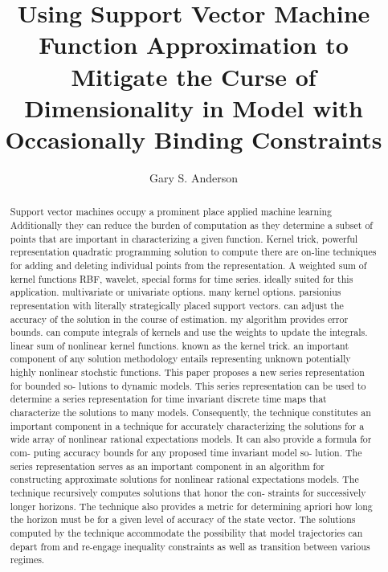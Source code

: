 \documentclass[12pt]{article}
\title{Using Support Vector Machine Function Approximation to
Mitigate the Curse of Dimensionality in Model with Occasionally Binding Constraints}
\author{Gary S. Anderson}
\begin{document}
\begin{abstract}
Support vector machines occupy a prominent place applied machine learning
Additionally they can reduce the burden of computation as they determine
a subset of points that are important in characterizing a given function.
Kernel trick,  powerful representation quadratic programming solution to compute there are on-line techniques for adding and deleting individual points from the representation.  A weighted sum of kernel functions RBF, wavelet, special forms for time series.    ideally suited for this application.  multivariate or univariate options.  many kernel options.  parsionius representation with literally strategically placed support vectors.  can adjust the accuracy of the solution in the course of estimation.  my algorithm provides error bounds.  can compute integrals of kernels and use the weights to update the integrals.  linear sum of nonlinear kernel functions. known as the kernel trick.  an important component of any solution methodology entails representing unknown potentially highly nonlinear stochstic functions.
  This paper proposes a new series representation for bounded so-
lutions to dynamic models. This series representation can be used
to determine a series representation for time invariant discrete time
maps that characterize the solutions to many models. Consequently,
the technique constitutes an important component in a technique for
accurately characterizing the solutions for a wide array of nonlinear
rational expectations models. It can also provide a formula for com-
puting accuracy bounds for any proposed time invariant model so-
lution. The series representation serves as an important component
in an algorithm for constructing approximate solutions for nonlinear
rational expectations models.
The technique recursively computes solutions that honor the con-
straints for successively longer horizons. The technique also provides
a metric for determining apriori how long the horizon must be for a
given level of accuracy of the state vector. The solutions computed by
the technique accommodate the possibility that model trajectories can
depart from and re-engage inequality constraints as well as transition
between various regimes.
\end{abstract}
\end{document}
